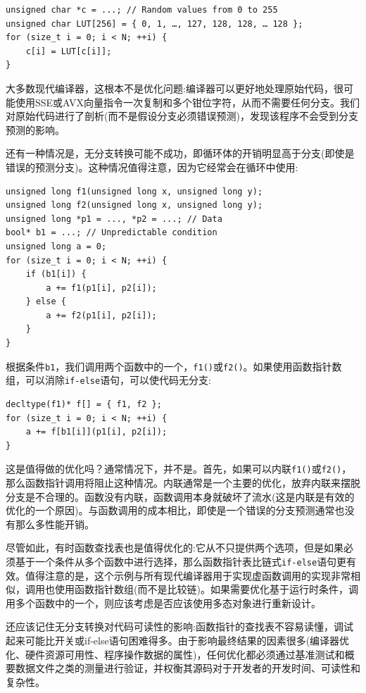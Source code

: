 \begin{lstlisting}[style=styleCXX]
unsigned char *c = ...; // Random values from 0 to 255
unsigned char LUT[256] = { 0, 1, …, 127, 128, 128, … 128 };
for (size_t i = 0; i < N; ++i) {
	c[i] = LUT[c[i]];
}
\end{lstlisting}

大多数现代编译器，这根本不是优化问题:编译器可以更好地处理原始代码，很可能使用SSE或AVX向量指令一次复制和多个钳位字符，从而不需要任何分支。我们对原始代码进行了剖析(而不是假设分支必须错误预测)，发现该程序不会受到分支预测的影响。

还有一种情况是，无分支转换可能不成功，即循环体的开销明显高于分支(即使是错误的预测分支)。这种情况值得注意，因为它经常会在循环中使用:

\begin{lstlisting}[style=styleCXX]
unsigned long f1(unsigned long x, unsigned long y);
unsigned long f2(unsigned long x, unsigned long y);
unsigned long *p1 = ..., *p2 = ...; // Data
bool* b1 = ...; // Unpredictable condition
unsigned long a = 0;
for (size_t i = 0; i < N; ++i) {
	if (b1[i]) {
		a += f1(p1[i], p2[i]);
	} else {
		a += f2(p1[i], p2[i]);
	}
}
\end{lstlisting}

根据条件\texttt{b1}，我们调用两个函数中的一个，\texttt{f1()}或\texttt{f2()}。如果使用函数指针数组，可以消除\texttt{if-else}语句，可以使代码无分支:

\begin{lstlisting}[style=styleCXX]
decltype(f1)* f[] = { f1, f2 };
for (size_t i = 0; i < N; ++i) {
	a += f[b1[i]](p1[i], p2[i]);
}
\end{lstlisting}

这是值得做的优化吗？通常情况下，并不是。首先，如果可以内联\texttt{f1()}或\texttt{f2()}，那么函数指针调用将阻止这种情况。内联通常是一个主要的优化，放弃内联来摆脱分支是不合理的。函数没有内联，函数调用本身就破坏了流水(这是内联是有效的优化的一个原因)。与函数调用的成本相比，即使是一个错误的分支预测通常也没有那么多性能开销。

尽管如此，有时函数查找表也是值得优化的:它从不只提供两个选项，但是如果必须基于一个条件从多个函数中进行选择，那么函数指针表比链式\texttt{if-else}语句更有效。值得注意的是，这个示例与所有现代编译器用于实现虚函数调用的实现非常相似，调用也使用函数指针数组(而不是比较链)。如果需要优化基于运行时条件，调用多个函数中的一个，则应该考虑是否应该使用多态对象进行重新设计。

还应该记住无分支转换对代码可读性的影响:函数指针的查找表不容易读懂，调试起来可能比开关或if-else语句困难得多。由于影响最终结果的因素很多(编译器优化、硬件资源可用性、程序操作数据的属性)，任何优化都必须通过基准测试和概要数据文件之类的测量进行验证，并权衡其源码对于开发者的开发时间、可读性和复杂性。






